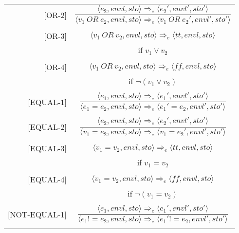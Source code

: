 \begin{longtable}[c] { r c }
  [OR-2] & \( 
    \dfrac { \langle e_2, envl, sto \rangle \Rightarrow_e \langle e_2', envl', sto' \rangle }
      { \langle v_1 \ OR \ e_2, envl, sto \rangle \Rightarrow_e \langle v_1 \ OR \ e_2', envl', sto' \rangle } \)
  \\
  & \\

  [OR-3] & \( 
    \langle v_1 \ OR \ v_2, envl, sto \rangle \Rightarrow_e \langle tt, envl, sto \rangle \)
  \\
  & if \( v_1 \lor v_2 \) \\
  & \\

  [OR-4] & \( 
    \langle v_1 \ OR \ v_2, envl, sto \rangle \Rightarrow_e \langle ff, envl, sto \rangle \)
  \\
  & if \( \neg(v_1 \lor  v_2) \) \\
  & \\

  [EQUAL-1] & \( 
    \dfrac { \langle e_1, envl, sto \rangle \Rightarrow_e \langle e_1', envl', sto' \rangle }
      { \langle e_1 = e_2, envl, sto \rangle \Rightarrow_e \langle e_1' = e_2, envl', sto' \rangle } \)
  \\
  & \\

  [EQUAL-2] & \( 
    \dfrac { \langle e_2, envl, sto \rangle \Rightarrow_e \langle e_2', envl', sto' \rangle }
      { \langle v_1 = e_2, envl, sto \rangle \Rightarrow_e \langle v_1 = e_2', envl', sto' \rangle } \)
  \\
  & \\

  [EQUAL-3] & \( 
    \langle v_1 = v_2, envl, sto \rangle \Rightarrow_e \langle tt, envl, sto \rangle \)
  \\
  & if \( v_1 = v_2 \) \\
  & \\

  [EQUAL-4] & \( 
    \langle v_1 = v_2, envl, sto \rangle \Rightarrow_e \langle ff, envl, sto \rangle \)
  \\
  & if \( \neg(v_1 = v_2) \) \\
  & \\

  [NOT-EQUAL-1] & \( 
    \dfrac { \langle e_1, envl, sto \rangle \Rightarrow_e \langle e_1', envl', sto' \rangle }
      { \langle e_1 != e_2, envl, sto \rangle \Rightarrow_e \langle e_1' != e_2, envl', sto' \rangle } \)
  \\
  & \\


\end{longtable}
